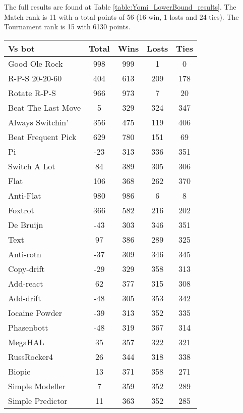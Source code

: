 The full results are found at Table \ref{table:Yomi_LowerBound_results}. The Match rank is 11 with a total points of 56 (16 win, 1 losts and 24 ties). The Tournament rank is 15 with 6130 points.

\begin{table*}
    \caption{Complete Yomi - Lower Bound results}
    \label{table:Yomi_LowerBound_results}
    \centering
    \begin{tabular}{|l|c|c|c|c|}
        \hline
        \textbf{Vs bot} & \textbf{Total} & \textbf{Wins} & \textbf{Losts} & \textbf{Ties} \\ \hline
Good Ole Rock & 998 & 999 & 1 & 0 \\ \hline 
R-P-S 20-20-60 & 404 & 613 & 209 & 178 \\ \hline 
Rotate R-P-S & 966 & 973 & 7 & 20 \\ \hline 
Beat The Last Move & 5 & 329 & 324 & 347 \\ \hline 
Always Switchin' & 356 & 475 & 119 & 406 \\ \hline 
Beat Frequent Pick & 629 & 780 & 151 & 69 \\ \hline 
Pi & -23 & 313 & 336 & 351 \\ \hline 
Switch A Lot & 84 & 389 & 305 & 306 \\ \hline 
Flat & 106 & 368 & 262 & 370 \\ \hline 
Anti-Flat & 980 & 986 & 6 & 8 \\ \hline 
Foxtrot & 366 & 582 & 216 & 202 \\ \hline 
De Bruijn & -43 & 303 & 346 & 351 \\ \hline 
Text & 97 & 386 & 289 & 325 \\ \hline 
Anti-rotn & -37 & 309 & 346 & 345 \\ \hline 
Copy-drift & -29 & 329 & 358 & 313 \\ \hline 
Add-react & 62 & 377 & 315 & 308 \\ \hline 
Add-drift & -48 & 305 & 353 & 342 \\ \hline 
Iocaine Powder & -39 & 313 & 352 & 335 \\ \hline 
Phasenbott & -48 & 319 & 367 & 314 \\ \hline 
MegaHAL & 35 & 357 & 322 & 321 \\ \hline 
RussRocker4 & 26 & 344 & 318 & 338 \\ \hline 
Biopic & 13 & 371 & 358 & 271 \\ \hline 
Simple Modeller & 7 & 359 & 352 & 289 \\ \hline 
Simple Predictor & 11 & 363 & 352 & 285 \\ \hline 

\end{tabular}
\end{table*}
